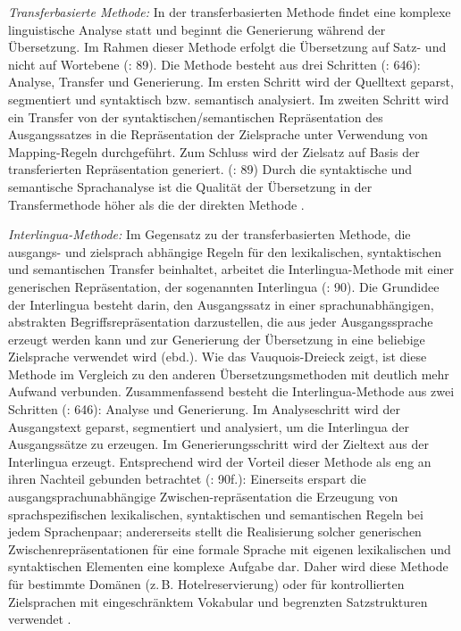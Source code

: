 \textit{Transferbasierte Methode:} In der transferbasierten Methode findet eine komplexe linguistische Analyse statt und beginnt die Generierung während der Übersetzung. Im Rahmen dieser Methode erfolgt die Übersetzung auf Satz- und nicht auf Wortebene (\citealt{WerthmannWitt2014}: 89). Die Methode besteht aus drei Schritten (\citealt{CarstensenEtAl2010}: 646): Analyse, Transfer und Generierung. Im ersten Schritt wird der Quelltext geparst, segmentiert und syntaktisch bzw. semantisch analysiert. Im zweiten Schritt wird ein Transfer von der syntaktischen/semantischen Repräsentation des Ausgangssatzes in die Repräsentation der Zielsprache unter Verwendung von Mapping-Regeln durchgeführt. Zum Schluss wird der Zielsatz auf Basis der transferierten Repräsentation generiert. (\citealt{WerthmannWitt2014}: 89) Durch die syntaktische und semantische Sprachanalyse ist die Qualität der Übersetzung in der Transfermethode höher als die der direkten Methode \citep{Stein2009}.

\textit{Interlingua-Methode:} Im Gegensatz zu der transferbasierten Methode, die aus\-gangs- und zielsprach abhängige Regeln für den lexikalischen, syntaktischen und semantischen Transfer beinhaltet, arbeitet die Interlingua-Methode mit einer generischen Repräsentation, der sogenannten Interlingua (\citealt{WerthmannWitt2014}: 90). Die Grundidee der Interlingua besteht darin, den Ausgangssatz in einer sprachunabhängigen, abstrakten Begriffsrepräsentation darzustellen, die aus jeder Ausgangssprache erzeugt werden kann und zur Generierung der Übersetzung in eine beliebige Zielsprache verwendet wird (ebd.). Wie das Vauquois-Dreieck zeigt, ist diese Methode im Vergleich zu den anderen Übersetzungsmethoden mit deutlich mehr Aufwand verbunden. Zusammenfassend besteht die Interlingua-Methode aus zwei Schritten (\citealt{CarstensenEtAl2010}: 646): Analyse und Generierung. Im Analyseschritt wird der Ausgangstext geparst, segmentiert und analysiert, um die Interlingua der Ausgangssätze zu erzeugen. Im Generierungsschritt wird der Zieltext aus der Interlingua erzeugt. Entsprechend wird der Vorteil dieser Methode als eng an ihren Nachteil gebunden betrachtet (\citealt{WerthmannWitt2014}: 90f.): Einerseits erspart die ausgangsprachunabhängige Zwischen-repräsentation die Erzeugung von sprachspezifischen lexikalischen, syntaktischen und semantischen Regeln bei jedem Sprachenpaar; andererseits stellt die Realisierung solcher generischen Zwischenrepräsentationen für eine formale Sprache mit eigenen lexikalischen und syntaktischen Elementen eine komplexe Aufgabe dar. Daher wird diese Methode für bestimmte Domänen (z.\,B. Hotelreservierung) oder für kontrollierten Zielsprachen mit eingeschränktem Vokabular und begrenzten Satzstrukturen verwendet \citep{Al-Ansary2011}.


